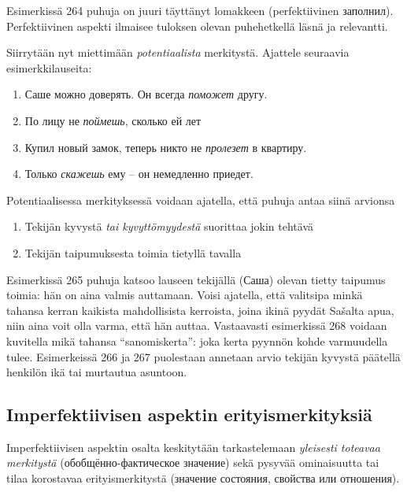 \documentclass[]{scrreprt}
\providecommand{\tightlist}{%
  \setlength{\itemsep}{0pt}\setlength{\parskip}{0pt}}
\begin{document}
Esimerkissä 264 puhuja on juuri täyttänyt lomakkeen (perfektiivinen
заполнил). Perfektiivinen aspekti ilmaisee tuloksen olevan puhehetkellä
läsnä ja relevantti.

Siirrytään nyt miettimään \emph{potentiaalista} merkitystä. Ajattele
seuraavia esimerkkilauseita:

\begin{enumerate}
\def\labelenumi{(\arabic{enumi})}
\setcounter{enumi}{264}
\tightlist
\item
  Саше можно доверять. Он всегда \emph{поможет} другу.
\item
  По лицу не \emph{поймешь}, сколько ей лет
\item
  Купил новый замок, теперь никто не \emph{пролезет} в квартиру.
\item
  Только \emph{скажешь} ему -- он немедленно приедет.
\end{enumerate}

Potentiaalisessa merkityksessä voidaan ajatella, että puhuja antaa siinä
arvionsa

\begin{enumerate}
\def\labelenumi{\arabic{enumi}.}
\tightlist
\item
  Tekijän kyvystä \emph{tai kyvyttömyydestä} suorittaa jokin tehtävä
\item
  Tekijän taipumuksesta toimia tietyllä tavalla
\end{enumerate}

Esimerkissä 265 puhuja katsoo lauseen tekijällä (Саша) olevan tietty
taipumus toimia: hän on aina valmis auttamaan. Voisi ajatella, että
valitsipa minkä tahansa kerran kaikista mahdollisista kerroista, joina
ikinä pyydät Sašalta apua, niin aina voit olla varma, että hän auttaa.
Vastaavasti esimerkissä 268 voidaan kuvitella mikä tahansa
``sanomiskerta'': joka kerta pyynnön kohde varmuudella tulee.
Esimerkeissä 266 ja 267 puolestaan annetaan arvio tekijän kyvystä
päätellä henkilön ikä tai murtautua asuntoon.

\subsection{Imperfektiivisen aspektin
erityismerkityksiä}\label{imperfektiivisen-aspektin-erityismerkityksiuxe4}

Imperfektiivisen aspektin osalta keskitytään tarkastelemaan
\emph{yleisesti toteavaa merkitystä} (обобщённо-фактическое значение)
sekä pysyvää ominaisuutta tai tilaa korostavaa erityismerkitystä
(значение состояния, свойства или отношения).
\end{document}
